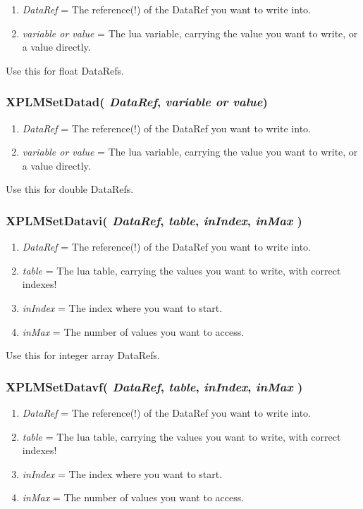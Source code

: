 \documentclass[11pt,parskip=half,a4paper]{scrartcl}
\begin{document}
\begin{enumerate}
	\item \emph{DataRef} = The reference(!) of the DataRef you want to write into.
	\item \emph{variable or value} = The lua variable, carrying the value you want to write, or a value directly.
\end{enumerate}

Use this for float DataRefs.

\subsubsection{XPLMSetDatad( \emph{DataRef}, \emph{variable or value})}

\begin{enumerate}
	\item \emph{DataRef} = The reference(!) of the DataRef you want to write into.
	\item \emph{variable or value} = The lua variable, carrying the value you want to write, or a value directly.
\end{enumerate}

Use this for double DataRefs.

\subsubsection{XPLMSetDatavi( \emph{DataRef}, \emph{table}, \emph{inIndex}, \emph{inMax} )}

\begin{enumerate}
	\item \emph{DataRef} = The reference(!) of the DataRef you want to write into.
	\item \emph{table} = The lua table, carrying the values you want to write, with correct indexes!
	\item \emph{inIndex} = The index where you want to start.
	\item \emph{inMax} = The number of values you want to access.
\end{enumerate}

Use this for integer array DataRefs.

\subsubsection{XPLMSetDatavf( \emph{DataRef}, \emph{table}, \emph{inIndex}, \emph{inMax} )}

\begin{enumerate}
	\item \emph{DataRef} = The reference(!) of the DataRef you want to write into.
	\item \emph{table} = The lua table, carrying the values you want to write, with correct indexes!
	\item \emph{inIndex} = The index where you want to start.
	\item \emph{inMax} = The number of values you want to access.
\end{enumerate}
\end{document}
